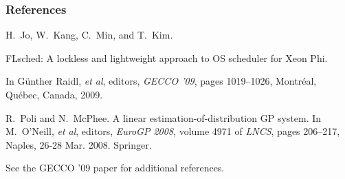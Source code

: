 \documentclass{beamer}
\newcommand{\linespace}{\vskip 0.25cm}
\begin{document}
\begin{frame} 
\frametitle{References} 

\begin{thebibliography}{lskdjf}

H.~Jo, W.~Kang, C.~Min, and T.~Kim.

\newblock FLsched: A lockless and lightweight approach to OS scheduler for Xeon Phi.

\newblock In G\"unther Raidl, \emph{et al}, editors, {\em GECCO '09}, pages 1019--1026, Montr\'eal, Qu\'ebec, Canada, 2009.

R.~Poli and N.~McPhee.
\newblock A linear estimation-of-distribution {GP} system.
\newblock In M.~O'Neill, \emph{et al}, editors, {\em EuroGP 2008}, volume
  4971 of {\em LNCS}, pages 206--217, Naples,
  26-28 Mar. 2008. Springer.
  
\end{thebibliography}

\linespace
\begin{center}
	See the GECCO '09 paper for additional references.
	\end{center}
\end{frame} 
\end{document}
